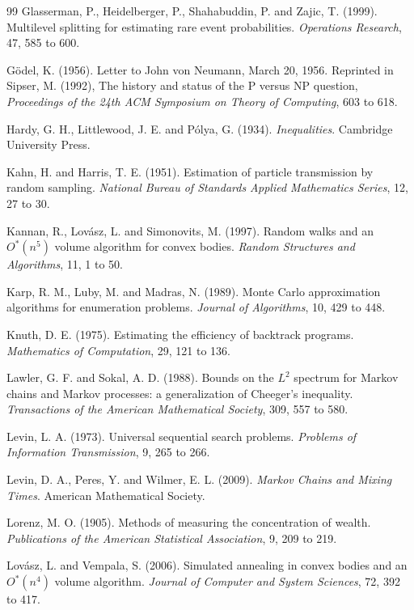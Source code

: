 \documentclass[11pt,twoside,openany]{book}
\theoremstyle{plain}
\theoremstyle{definition}
\theoremstyle{remark}
\begin{document}
\begin{thebibliography}{99}
 Glasserman, P., Heidelberger, P., Shahabuddin, P. and Zajic, T. (1999). Multilevel splitting for estimating rare event probabilities. \emph{Operations Research}, 47, 585 to 600.

 G\"odel, K. (1956). Letter to John von Neumann, March 20, 1956. Reprinted in Sipser, M. (1992), The history and status of the P versus NP question, \emph{Proceedings of the 24th ACM Symposium on Theory of Computing}, 603 to 618.

 Hardy, G. H., Littlewood, J. E. and P\'olya, G. (1934). \emph{Inequalities}. Cambridge University Press.

 Kahn, H. and Harris, T. E. (1951). Estimation of particle transmission by random sampling. \emph{National Bureau of Standards Applied Mathematics Series}, 12, 27 to 30.

 Kannan, R., Lov\'asz, L. and Simonovits, M. (1997). Random walks and an $O^*(n^5)$ volume algorithm for convex bodies. \emph{Random Structures and Algorithms}, 11, 1 to 50.

 Karp, R. M., Luby, M. and Madras, N. (1989). Monte Carlo approximation algorithms for enumeration problems. \emph{Journal of Algorithms}, 10, 429 to 448.

 Knuth, D. E. (1975). Estimating the efficiency of backtrack programs. \emph{Mathematics of Computation}, 29, 121 to 136.

 Lawler, G. F. and Sokal, A. D. (1988). Bounds on the $L^2$ spectrum for Markov chains and Markov processes: a generalization of Cheeger's inequality. \emph{Transactions of the American Mathematical Society}, 309, 557 to 580.

 Levin, L. A. (1973). Universal sequential search problems. \emph{Problems of Information Transmission}, 9, 265 to 266.

 Levin, D. A., Peres, Y. and Wilmer, E. L. (2009). \emph{Markov Chains and Mixing Times}. American Mathematical Society.

 Lorenz, M. O. (1905). Methods of measuring the concentration of wealth. \emph{Publications of the American Statistical Association}, 9, 209 to 219.

 Lov\'asz, L. and Vempala, S. (2006). Simulated annealing in convex bodies and an $O^*(n^4)$ volume algorithm. \emph{Journal of Computer and System Sciences}, 72, 392 to 417.


\end{thebibliography}
\end{document}
